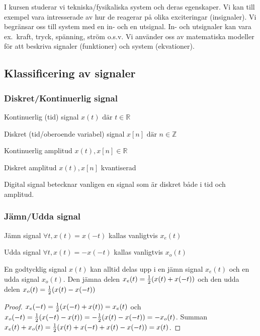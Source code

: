 \documentclass[a4paper]{article}
\begin{document}
\providecommand\fname{}
\renewcommand\fname{19-09-03}

I kursen studerar vi tekniska/fysikaliska system och deras egenskaper. Vi kan 
till exempel vara intresserade av hur de reagerar på olika exciteringar 
(insignaler). Vi begränsar oss till system med en in- och en utsignal. 
In- och utsignaler kan vara ex.\ kraft, tryck, spänning, ström o.s.v. 
Vi använder oss av matematiska modeller för att beskriva signaler 
(funktioner) och system (ekvationer). 

\subsection{Klassificering av signaler}
\subsubsection{Diskret/Kontinuerlig signal}
Kontinuerlig (tid) signal \(
    x(t) \text{ där } t \in \mathbb{R}
\)

Diskret (tid/oberoende variabel) signal \(
    x[n] \text{ där } n \in \mathbb{Z}
\) 

Kontinuerlig amplitud \(
    x(t), x[n] \in \mathbb{R}
\) 

Diskret amplitud \(
    x(t), x[n] 
\) kvantiserad

Digital signal betecknar vanligen en signal som är diskret både i tid och 
amplitud.

\subsubsection{Jämn/Udda signal}
Jämn signal \(
    \forall t, x(t) = x(-t)
\) kallas vanligtvis \(
    x_e(t)
\) 

Udda signal \(
    \forall t, x(t) = -x(-t)
\) kallas vanligtvis \(
    x_o(t)
\) 

\begin{sats}
En godtycklig signal \(
    x(t)
\) kan alltid delas upp i en jämn signal \(
    x_e(t)
\) och en udda signal \(
    x_o(t)
\). Den jämna delen \(
    x_e(t) = \frac{1}{2} (x(t) + x(-t))
\) och den udda delen \(
    x_o(t) = \frac{1}{2} (x(t) - x(-t))
\) 
\begin{proof}
    \(
        x_e(-t) = \frac{1}{2} (x(-t) + x(t)) = x_e(t)
    \) och \(
        x_o(-t) = \frac{1}{2} (x(-t) - x(t)) = - \frac{1}{2} (x(t) - x(-t)) = - x_o(t)
    \). Summan \(
        x_e(t) + x_o(t) = \frac{1}{2} (x(t) + x(-t) + x(t) - x(-t)) = x(t)
    \).
\end{proof}

\end{sats}
\end{document}
